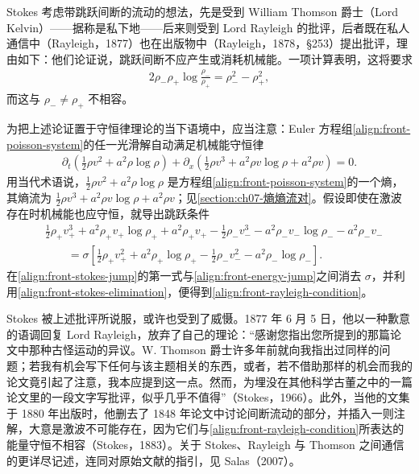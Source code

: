 \documentclass[../../main.tex]{subfiles}
\begin{document}
Stokes 考虑带跳跃间断的流动的想法，先是受到 William Thomson 爵士（Lord Kelvin）——据称是私下地——后来则受到 Lord Rayleigh 的批评，后者既在私人通信中（Rayleigh，1877）也在出版物中（Rayleigh，1878，§253）提出批评，理由如下：他们论证说，跳跃间断不应产生或消耗机械能。一项计算表明，这将要求
\begin{align}
2\rho_-\rho_+\log\frac{\rho_-}{\rho_+}=\rho_-^{2}-\rho_+^{2},\label{align:front-rayleigh-condition}
\end{align}
而这与 $\rho_-\neq\rho_+$ 不相容。

为把上述论证置于守恒律理论的当下语境中，应当注意：Euler 方程组\eqref{align:front-poisson-system}的任一光滑解自动满足机械能守恒律
\begin{align}
\partial_t\left(\frac{1}{2}\rho v^{2}+a^{2}\rho\log\rho\right)+\partial_x\left(\frac{1}{2}\rho v^{3}+a^{2}\rho v\log\rho+a^{2}\rho v\right)=0.\label{align:front-energy-law}
\end{align}
用当代术语说，$\tfrac{1}{2}\rho v^{2}+a^{2}\rho\log\rho$ 是方程组\eqref{align:front-poisson-system}的一个熵，其熵流为 $\tfrac{1}{2}\rho v^{3}+a^{2}\rho v\log\rho+a^{2}\rho v$；见\cref{section:ch07-熵熵流对}。假设即使在激波存在时机械能也应守恒，就导出跳跃条件
\begin{align}
&\frac{1}{2}\rho_+v_+^{3}+a^{2}\rho_+v_+\log\rho_++a^{2}\rho_+v_+-\frac{1}{2}\rho_-v_-^{3}-a^{2}\rho_-v_-\log\rho_--a^{2}\rho_-v_-\label{align:front-energy-jump}\\
&\qquad=\sigma\left[\frac{1}{2}\rho_+v_+^{2}+a^{2}\rho_+\log\rho_+-\frac{1}{2}\rho_-v_-^{2}-a^{2}\rho_-\log\rho_-\right].\nonumber
\end{align}
在\eqref{align:front-stokes-jump}的第一式与\eqref{align:front-energy-jump}之间消去 $\sigma$，并利用\eqref{align:front-stokes-elimination}，便得到\eqref{align:front-rayleigh-condition}。

Stokes 被上述批评所说服，或许也受到了威慑。1877 年 6 月 5 日，他以一种歉意的语调回复 Lord Rayleigh，放弃了自己的理论：“感谢您指出您所提到的那篇论文中那种古怪运动的异议。W. Thomson 爵士许多年前就向我指出过同样的问题；若我有机会写下任何与该主题相关的东西，或者，若不借助那样的机会而我的论文竟引起了注意，我本应提到这一点。然而，为埋没在其他科学古董之中的一篇论文里的一段文字写批评，似乎几乎不值得”（Stokes，1966）。此外，当他的文集于 1880 年出版时，他删去了 1848 年论文中讨论间断流动的部分，并插入一则注解，大意是激波不可能存在，因为它们与\eqref{align:front-rayleigh-condition}所表达的能量守恒不相容（Stokes，1883）。关于 Stokes、Rayleigh 与 Thomson 之间通信的更详尽记述，连同对原始文献的指引，见 Salas（2007）。
\end{document}
